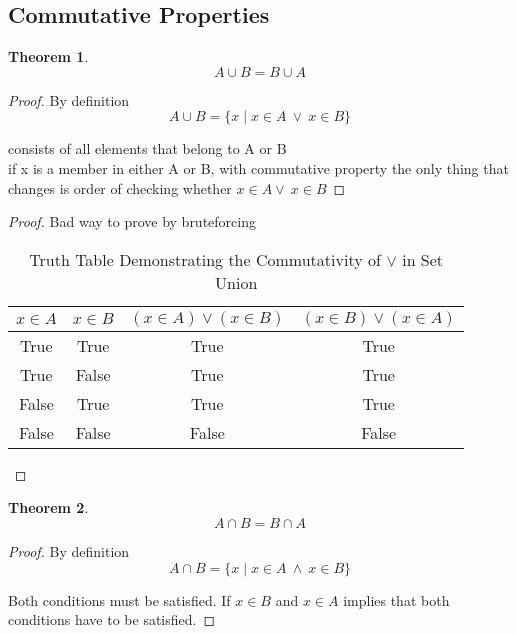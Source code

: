 \documentclass{article}  %
\newtheorem{theorem}{Theorem}[section]
\theoremstyle{definition}
\begin{document}
\subsection{Commutative Properties}
\begin{theorem}
\[
    A \cup B = B \cup A
\]
\end{theorem}
\begin{proof}

    By definition
    \[
        A\cup B = \{x \mid x \in A \:\lor\: x \in B\}
    \]

    consists of all elements that belong to A or B\\
    if x is a member in either A or B, with commutative property the only thing
    that changes is order of checking whether $x \in A \lor \: x \in B$
\end{proof}
\begin{proof}
    Bad way to prove by bruteforcing
    \begin{table}[ht]
    \centering
    \begin{tabular}{cccc}
        \toprule
        \( x \in A \) & \( x \in B \) & \((x \in A) \lor (x \in B)\) & \((x \in B) \lor (x \in A)\) \\
        \midrule
        True  & True  & True  & True  \\
        True  & False & True  & True  \\
        False & True  & True  & True  \\
        False & False & False & False \\
        \bottomrule
    \end{tabular}
    \caption{Truth Table Demonstrating the Commutativity of \(\lor\) in Set Union}
    \end{table}

\end{proof}

\begin{theorem}
    \[
        A \cap B = B \cap A
    \]
\end{theorem}

\begin{proof}
        By definition
    \[
        A\cap B = \{x \mid x \in A \:\land\: x \in B\}
    \]

    Both conditions must be satisfied.
    If $x \in B$ and $x \in A$ implies that both conditions
    have to be satisfied.

\end{proof}
\end{document}
